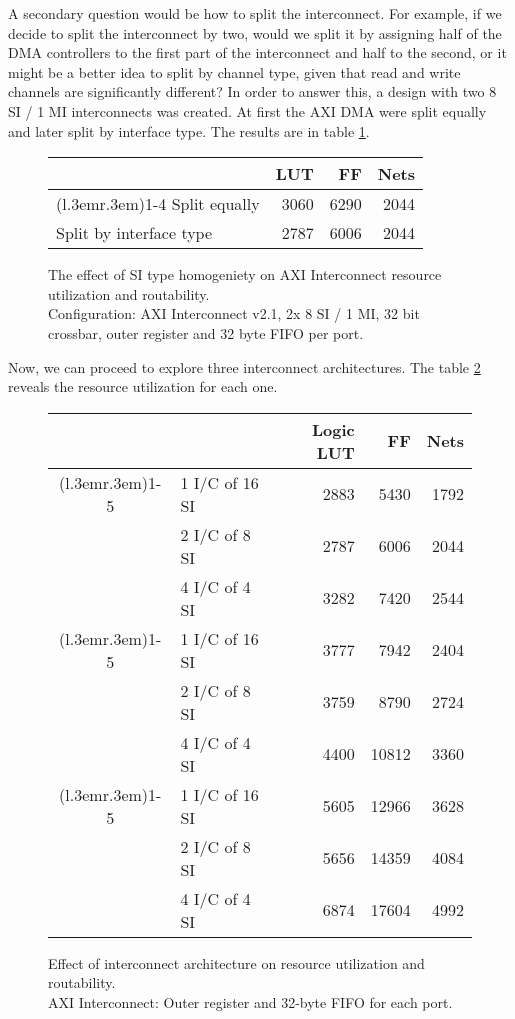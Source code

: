 A secondary question would be how to split the interconnect. 
For example, if we decide to split the interconnect by two, 
would we split it by assigning half of the DMA controllers to the first
part of the interconnect and half to the second, or it might be a better idea to split by
channel type, given that read and write channels are significantly different? 
In order to answer this, a design with two 8 SI / 1 MI interconnects was created.
At first the AXI DMA were split equally and later split by interface type.
The results are in table \ref{tab:int-mixed}.

\begin{figure}[ht!]
\centering
\begin{tabular}{lrrr}
\toprule
			& LUT	& FF	& Nets \\
\cmidrule(l{.3em}r{.3em}){1-4}
Split equally 		& 3060	&6290	&2044 	\\
Split by interface type	& 2787	&6006	& 2044	\\
\bottomrule
\end{tabular}
\caption{The effect of SI type homogeniety on AXI Interconnect resource utilization and routability.\\
	Configuration: AXI Interconnect v2.1, 2x 8 SI / 1 MI, 32 bit crossbar, 
	outer register and 32 byte FIFO per port.}
\label{tab:int-mixed}
\end{figure}

Now, we can proceed to explore three interconnect architectures.
The table \ref{tab:int-msi} reveals the resource utilization for each one.

\begin{figure}[ht!]
\centering
\begin{tabular}{cl rrr}
\toprule
&		&Logic LUT & FF	& Nets \\
\cmidrule(l{.3em}r{.3em}){1-5}
\multirow{3}{*}{\rotatebox{90}{32 bit}}			
&1 I/C of 16 SI	& 2883	& 5430	& 1792 	\\
&2 I/C of 8 SI	& 2787	& 6006	& 2044	\\
&4 I/C of 4 SI	& 3282	& 7420	& 2544	\\
\cmidrule(l{.3em}r{.3em}){1-5}
\multirow{3}{*}{\rotatebox{90}{64 bit}}
&1 I/C of 16 SI	& 3777	& 7942 	& 2404	\\
&2 I/C of 8 SI	& 3759	& 8790	& 2724	\\
&4 I/C of 4 SI	& 4400	&10812	& 3360	\\
\cmidrule(l{.3em}r{.3em}){1-5}
\multirow{3}{*}{\rotatebox{90}{128 bit}}
&1 I/C of 16 SI	& 5605	& 12966	& 3628	\\
&2 I/C of 8 SI	& 5656	& 14359	& 4084	\\
&4 I/C of 4 SI	& 6874	& 17604	& 4992	\\
\bottomrule
\end{tabular}
\caption{Effect of interconnect architecture on resource utilization and routability.\\
	AXI Interconnect: Outer register and 32-byte FIFO for each port.}
\label{tab:int-msi}
\end{figure}

